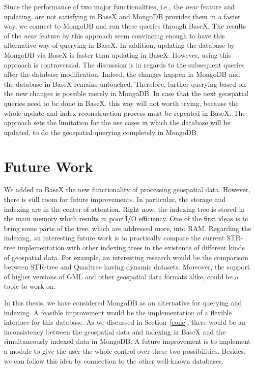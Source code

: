\documentclass[a4paper,12pt]{article}
\begin{document}
Since the performance of two major functionalities, i.e., the \textit{near} feature and updating, are not satisfying in BaseX and MongoDB provides them in a faster way, we connect to MongoDB and run these queries through BaseX. The results of the \textit{near} feature by this approach seem convincing enough to have this alternative way of querying in BaseX. In addition, updating the database by MongoDB via BaseX is faster than updating in BaseX. However, using this approach is controversial. The discussion is in regards to the subsequent queries after the database modification. Indeed, the changes happen in MongoDB and the database in BaseX remains untouched. Therefore, further querying based on the new changes is possible merely in MongoDB. In case that the next geospatial queries need to be done in BaseX, this way will not worth trying, because the whole update and index reconstruction process must be repeated in BaseX. The approach sets the limitation for the use cases in which the database will be updated, to do the geospatial querying completely in MongoDB.


\newpage
\section{Future Work}
\label{s.future}
We added to BaseX the new functionality of processing geospatial data.
However, there is still room for future improvements. 
In particular, the storage and indexing are in the center of attention.
Right now, the indexing tree is stored in the main memory 
which results in poor I/O efficiency.%
One of the first ideas is to bring some parts of the tree, 
which are addressed more, into RAM.
Regarding the indexing, an interesting future work is to practically compare 
the current STR-tree implementation with other indexing trees in the existence of
different kinds of geospatial data. For example, an interesting research would be
the comparison between STR-tree and Quadtree having dynamic datasets.
Moreover, the support of higher versions of GML and other geospatial data 
formats alike, could be a topic to work on.

In this thesis, we have considered MongoDB as an alternative for querying and indexing.
A feasible improvement would be the implementation of a flexible interface
for this database. As we discussed in Section~\ref{conc}, 
there would be an inconsistency between 
the geospatial data and indexing in BaseX and
the simultaneously indexed data in MongoDB. A future improvement is to 
implement a module to give the user the whole control over these two possibilities.
Besides, we can follow this idea by connection to the other well-known databases.
\end{document}
